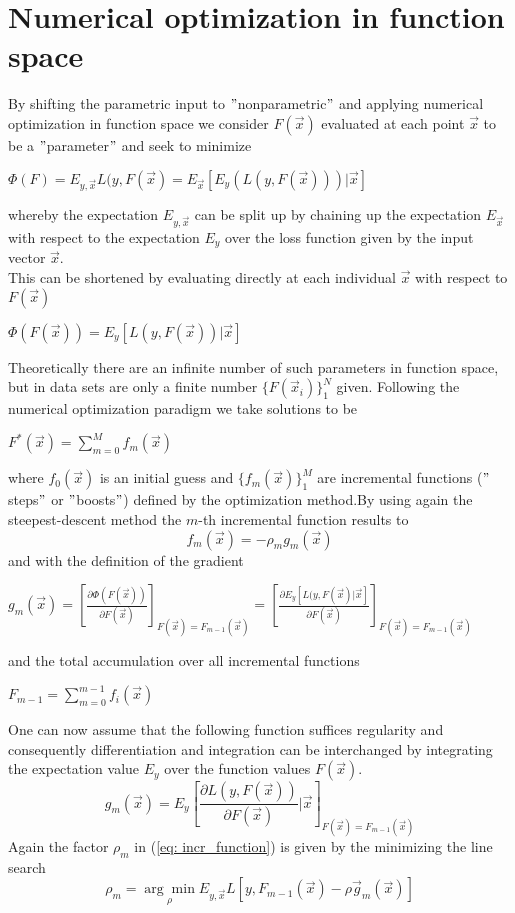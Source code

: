 \documentclass[12pt, a4paper]{article}
\begin{document}
\section{Numerical optimization in function space}

By shifting the parametric input to $"$nonparametric$"$ and applying numerical optimization in function space we consider $F(\vec{x})$ evaluated at each point $\vec{x}$ to be a $"$parameter$"$ and seek to minimize
\begin{center}
    $\Phi(F) = E_{y,\vec{x}} L(y,F(\vec{x}) = E_{\vec{x}}[E_y(L(y,F(\vec{x})))|\vec{x}]$
\end{center}
whereby the expectation $E_{y,\vec{x}}$ can be split up by chaining up the expectation $E_{\vec{x}}$ with respect to the expectation $E_y$ over the loss function given by the input vector $\vec{x}$. \\
This can be shortened by evaluating directly at each individual $\vec{x}$ with respect to $F(\vec{x})$
\begin{center}
    $\Phi(F(\vec{x})) = E_y [L(y,F(\vec{x}))|\vec{x}]$
\end{center}
Theoretically there are an infinite number of such parameters in function space, but in data sets are only a finite number $\{F(\vec{x}_i)\}_1^N$ given. Following the numerical optimization paradigm we take solutions to be 
\begin{center}
    $F^{\ast}(\vec{x}) = \sum_{m=0}^{M} f_m(\vec{x})$
\end{center}
where $f_0(\vec{x})$ is an initial guess and $\{f_m(\vec{x})\}_1^M$ are incremental functions ($"$steps$"$ or $"$boosts$"$) defined by the optimization method.By using again the steepest-descent method the $m$-th incremental function results to
\begin{equation}
    \label{eq: incr_function}
    f_m(\vec{x}) = - \rho_m g_m(\vec{x})
\end{equation}
and with the definition of the gradient 
\begin{center}
    $g_m(\vec{x}) = [\frac{\partial \Phi(F(\vec{x}))}{\partial F(\vec{x})}]_{F(\vec{x}) = F_{m-1}(\vec{x})} = [\frac{\partial E_y [L(y,F(\vec{x})|\vec{x}]}{\partial F(\vec{x})}]_{F(\vec{x}) = F_{m-1}(\vec{x})}$  
\end{center} 
and the total accumulation over all incremental functions 
\begin{center}    
    $F_{m-1} = \sum_{m=0}^{m-1} f_i(\vec{x})$
\end{center}
One can now assume that the following function suffices regularity and consequently differentiation and integration can be interchanged by integrating the expectation value $E_y$ over the function values $F(\vec{x})$. 
\begin{equation}
    g_m(\vec{x}) = E_y [\frac{\partial L(y, F(\vec{x}))}{\partial F(\vec{x})} | \vec{x}]_{F(\vec{x}) = F_{m-1}(\vec{x})}
\end{equation}
Again the factor $\rho_m$ in (\ref{eq: incr_function}) is given by the minimizing the line search
\begin{equation}
    \rho_m = \underset{\rho}{\arg\min} E_{y,\vec{x}} L[y,F_{m-1}(\vec{x}) - \rho \vec{g}_m(\vec{x})]
\end{equation}
\end{document}
